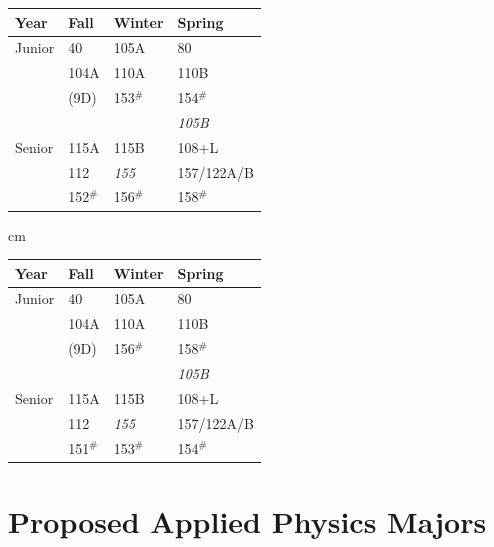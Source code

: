 \documentclass[12pt]{article}
\begin{document}
\newpage
{}
  \label{tbl:proposed-astro}
\begin{center}
\begin{tabular}{|l|l|l|l|}
\hline
Year      & Fall    & Winter & Spring \\
\hline
Junior    & 40         & 105A     & 80 \\
          & 104A       & 110A     & 110B \\
          & (9D)       & 153$^\#$ & 154$^\#$ \\
          &            &          & {\it 105B} \\
\hline
Senior   & 115A     & 115B & 108+L\\
         & 112      & {\it 155} & 157/122A/B \\
         & 152$^\#$ & 156$^\#$ & 158$^\#$ \\
\hline 
\end{tabular}

 cm

\begin{tabular}{|l|l|l|l|}
\hline
Year      & Fall    & Winter & Spring \\
\hline
Junior    & 40         & 105A     & 80 \\
          & 104A       & 110A     & 110B \\
          & (9D)       & 156$^\#$ & 158$^\#$ \\
          &            &          & {\it 105B} \\
\hline
Senior   & 115A     & 115B & 108+L\\
         & 112      & {\it 155} & 157/122A/B \\
         & 151$^\#$ & 153$^\#$ & 154$^\#$ \\
\hline 
\end{tabular}
\vskip 0.5cm
\end{center}

\newpage
\section{Proposed Applied Physics Majors}
\label{sec:applied}
\end{document}

